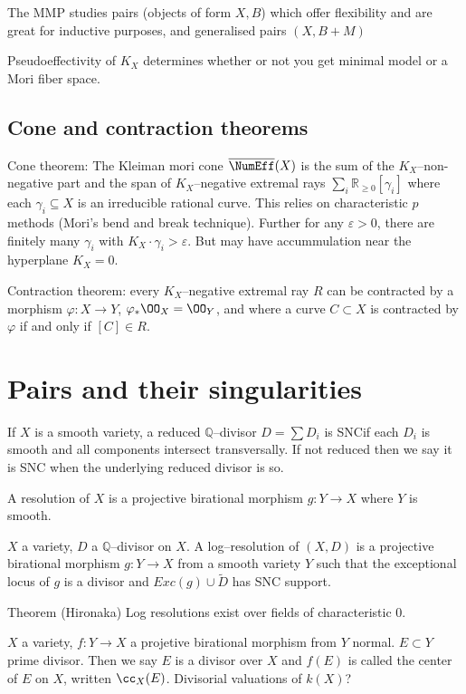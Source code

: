 The MMP studies pairs (objects of form \(X,B\)) which offer flexibility and
are great for inductive purposes, and generalised pairs \((X,B+M)\)

Pseudoeffectivity of \(K_X\) determines whether or not you get minimal model or
a Mori fiber space.

\subsection{Cone and contraction theorems}
Cone theorem: The Kleiman mori cone \(\overline{\NumEff}(X)\) is the sum of the
\(K_X\)--non-negative part and the span of \(K_X\)--negative extremal rays
\(\sum_i \mathbb{R}_{\geq 0}[\gamma_i]\) where each \(\gamma_i\subseteq X\) is
an irreducible rational curve. This relies on characteristic \(p\) methods
(Mori's bend and break technique). Further for any \(\varepsilon>0\), there
are finitely many \(\gamma_i\) with \(K_X\cdot \gamma_i > \varepsilon\). But may
have accummulation near the hyperplane \(K_X=0\).

Contraction theorem: every \(K_X\)--negative extremal ray \(R\) can be
contracted by a morphism \(\varphi:X\to Y\), \(\varphi_\ast \OO_X=\OO_Y\), and
where a curve \(C\subset X\) is contracted by \(\varphi\) if and only if
\([C]\in R\).

\section{Pairs and their singularities} If \(X\) is a smooth variety, a reduced
\(\mathbb{Q}\)--divisor \(D=\sum D_i\) is SNCif each \(D_i\) is smooth and all
components intersect transversally. If not reduced then we say it is SNC when
the underlying reduced divisor is so.

A resolution of \(X\) is a projective birational morphism \(g:Y\to X\) where
\(Y\) is smooth.

\(X\) a variety, \(D\) a \(\mathbb{Q}\)--divisor on \(X\). A log--resolution of
\((X,D)\) is a projective birational morphism \(g:Y\to X\) from a smooth variety
\(Y\) such that the exceptional locus of \(g\) is a divisor and \(Exc(g)\cup
\tilde{D}\) has SNC support.

Theorem (Hironaka) Log resolutions exist over fields of characteristic \(0\).

\(X\) a variety, \(f:Y\to X\) a projetive birational morphism from \(Y\) normal.
\(E\subset Y\) prime divisor. Then we say \(E\) is a divisor over \(X\) and
\(f(E)\) is called the center of \(E\) on \(X\), written \(\cc_X(E)\).
Divisorial valuations of \(k(X)\)?

